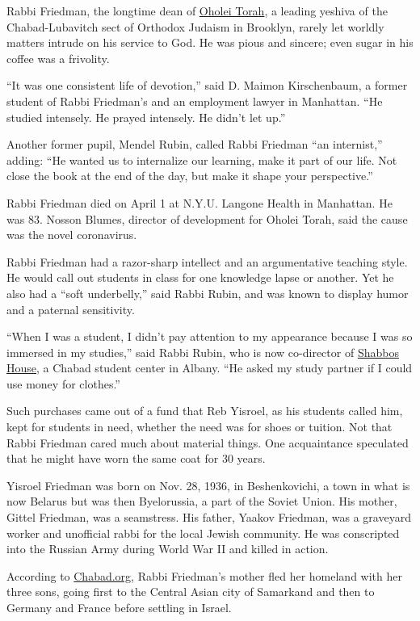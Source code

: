 Rabbi Friedman, the longtime dean of
\href{https://www.oholeitorah.com/}{Oholei Torah}, a leading yeshiva of
the Chabad-Lubavitch sect of Orthodox Judaism in Brooklyn, rarely let
worldly matters intrude on his service to God. He was pious and sincere;
even sugar in his coffee was a frivolity.

``It was one consistent life of devotion,'' said D. Maimon Kirschenbaum,
a former student of Rabbi Friedman's and an employment lawyer in
Manhattan. ``He studied intensely. He prayed intensely. He didn't let
up.''

Another former pupil, Mendel Rubin, called Rabbi Friedman ``an
internist,'' adding: ``He wanted us to internalize our learning, make it
part of our life. Not close the book at the end of the day, but make it
shape your perspective.''

Rabbi Friedman died on April 1 at N.Y.U. Langone Health in Manhattan. He
was 83. Nosson Blumes, director of development for Oholei Torah, said
the cause was the novel coronavirus.

Rabbi Friedman had a razor-sharp intellect and an argumentative teaching
style. He would call out students in class for one knowledge lapse or
another. Yet he also had a ``soft underbelly,'' said Rabbi Rubin, and
was known to display humor and a paternal sensitivity.

``When I was a student, I didn't pay attention to my appearance because
I was so immersed in my studies,'' said Rabbi Rubin, who is now
co-director of \href{https://www.shabboshouse.org/}{Shabbos House}, a
Chabad student center in Albany. ``He asked my study partner if I could
use money for clothes.''

Such purchases came out of a fund that Reb Yisroel, as his students
called him, kept for students in need, whether the need was for shoes or
tuition. Not that Rabbi Friedman cared much about material things. One
acquaintance speculated that he might have worn the same coat for 30
years.

Yisroel Friedman was born on Nov. 28, 1936, in Beshenkovichi, a town in
what is now Belarus but was then Byelorussia, a part of the Soviet
Union. His mother, Gittel Friedman, was a seamstress. His father, Yaakov
Friedman, was a graveyard worker and unofficial rabbi for the local
Jewish community. He was conscripted into the Russian Army during World
War II and killed in action.

According to
\href{https://www.chabad.org/news/article_cdo/aid/4703093/jewish/Rabbi-Yisroel-Friedman-84-Talmudic-Genius-and-Fiery-Chassid.htm}{Chabad.org},
Rabbi Friedman's mother fled her homeland with her three sons, going
first to the Central Asian city of Samarkand and then to Germany and
France before settling in Israel.

